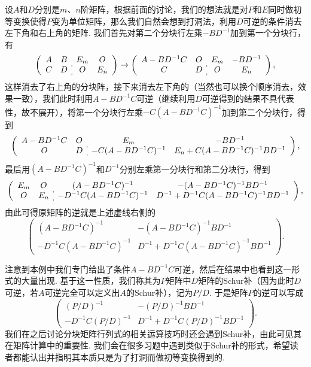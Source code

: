 \begin{solution}
    设$A$和$D$分别是$m$、$n$阶矩阵，根据前面的讨论，我们的想法就是对$P$和$E$同时做初等变换使得$P$变为单位矩阵，那么我们自然会想到打洞法，利用$D$可逆的条件消去左下角和右上角的矩阵. 我们首先对第二个分块行左乘$-BD^{-1}$加到第一个分块行，有
    \[\left(\begin{array}{cc:cc}
                A & B & E_m & O \\ C & D & O & E_n
            \end{array}\right)\rightarrow\left(\begin{array}{cc:cc}
                A-BD^{-1}C & O & E_m & -BD^{-1} \\ C & D & O & E_n
            \end{array}\right),\]
    这样消去了右上角的分块阵，接下来消去左下角的（当然也可以换个顺序消去，效果一致），我们此时利用$A-BD^{-1}C$可逆（继续利用$D$可逆得到的结果不具代表性，故不展开），将第一个分块行左乘$-C(A-BD^{-1}C)^{-1}$加到第二个分块行，得到
    \[\left(\begin{array}{cc:cc}
                A-BD^{-1}C & O & E_m & -BD^{-1} \\ O & D & -C(A-BD^{-1}C)^{-1} & E_n+C(A-BD^{-1}C)^{-1}BD^{-1}
            \end{array}\right),\]
    最后用$(A-BD^{-1}C)^{-1}$和$D^{-1}$分别左乘第一分块行和第二分块行，得到
    \[\left(\begin{array}{cc:cc}
                E_m & O & (A-BD^{-1}C)^{-1} & -(A-BD^{-1}C)^{-1}BD^{-1} \\ O & E_n & -D^{-1}C(A-BD^{-1}C)^{-1} & D^{-1}+D^{-1}C(A-BD^{-1}C)^{-1}BD^{-1}
            \end{array}\right),\]
    由此可得原矩阵的逆就是上述虚线右侧的
    \[\begin{pmatrix}
            (A-BD^{-1}C)^{-1} & -(A-BD^{-1}C)^{-1}BD^{-1} \\ -D^{-1}C(A-BD^{-1}C)^{-1} & D^{-1}+D^{-1}C(A-BD^{-1}C)^{-1}BD^{-1}
        \end{pmatrix}.\]
\end{solution}

注意到本例中我们专门给出了条件$A-BD^{-1}C$可逆，然后在结果中也看到这一形式的大量出现. 基于这一性质，我们称其为$P$矩阵中$D$矩阵的Schur补（因为此时$D$可逆，若$A$可逆完全可以定义出$A$的Schur补），记为$P/D$. 于是矩阵$P$的逆可以写成
\[\begin{pmatrix}
        (P/D)^{-1} & -(P/D)^{-1}BD^{-1} \\ -D^{-1}C(P/D)^{-1} & D^{-1}+D^{-1}C(P/D)^{-1}BD^{-1}
    \end{pmatrix}.\]
我们在之后讨论分块矩阵行列式的相关运算技巧时还会遇到Schur补，由此可见其在矩阵计算中的重要性. 我们会在很多习题中遇到类似于Schur补的形式，希望读者都能认出并指明其本质只是为了打洞而做初等变换得到的.

